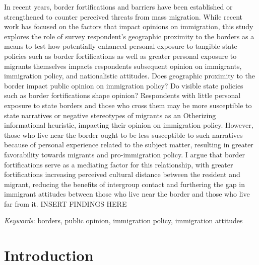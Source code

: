 \documentclass[12pt,]{article}
\renewenvironment{abstract}
 {{%
    \setlength{\leftmargin}{0mm}
    \setlength{\rightmargin}{\leftmargin}%
  }%
  \relax}
 {\endlist}
\begin{document}
\begin{abstract}

    \hbox{\vrule height .2pt width 39.14pc}

    \vskip 8.5pt %

\noindent In recent years, border fortifications and barriers have been
established or strengthened to counter perceived threats from mass
migration. While recent work has focused on the factors that impact
opinions on immigration, this study explores the role of survey
respondent's geographic proximity to the borders as a means to test how
potentially enhanced personal exposure to tangible state policies such
as border fortifications as well as greater personal exposure to
migrants themselves impacts respondents subsequent opinion on
immigrants, immigration policy, and nationalistic attitudes. Does
geographic proximity to the border impact public opinion on immigration
policy? Do visible state policies such as border fortifications shape
opinion? Respondents with little personal exposure to state borders and
those who cross them may be more susceptible to state narratives or
negative stereotypes of migrants as an Otherizing informational
heuristic, impacting their opinion on immigration policy. However, those
who live near the border ought to be less susceptible to such narratives
because of personal experience related to the subject matter, resulting
in greater favorability towards migrants and pro-immigration policy. I
argue that border fortifications serve as a mediating factor for this
relationship, with greater fortifications increasing perceived cultural
distance between the resident and migrant, reducing the benefits of
intergroup contact and furthering the gap in immigrant attitudes between
those who live near the border and those who live far from it. INSERT
FINDINGS HERE


\vskip 8.5pt \noindent \emph{Keywords}: borders, public opinion,
immigration policy, immigration attitudes \par

    \hbox{\vrule height .2pt width 39.14pc}



\end{abstract}


\vskip 6.5pt


\noindent \doublespacing \section{Introduction}\label{introduction}
\end{document}
